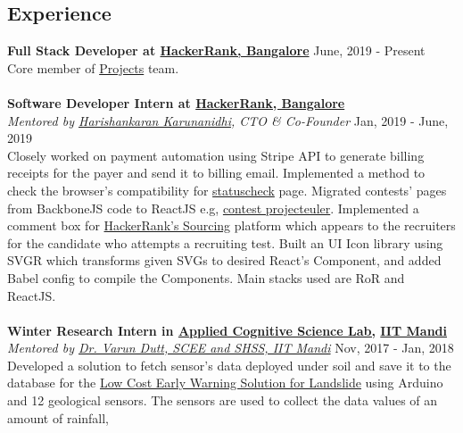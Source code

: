 \documentclass[margin, centered]{res}
\begin{document}
\begin{resume}
        \section{Experience}
            \textbf{Full Stack Developer at \href{https://www.hackerrank.com}{HackerRank, Bangalore}} \hfill June, 2019 - Present \\
            Core member of \href{https://www.hackerrank.com/products/projects}{Projects} team. \\
            \\
            \textbf{Software Developer Intern at \href{https://www.hackerrank.com}{HackerRank, Bangalore}} \\
            \emph{Mentored by \href{https://www.hackerrank.com/about-us/our-team/}{Harishankaran
            Karunanidhi}\footnotesize{, CTO \& Co-Founder}} \hfill Jan, 2019 - June, 2019 \\
            Closely worked on payment automation using Stripe API to generate billing receipts for
            the payer and send it to billing email. Implemented a method to check the browser's compatibility
            for \href{https://www.hackerrank.com/statuscheck}{statuscheck} page. Migrated contests' pages from
            BackboneJS code to ReactJS e.g, \href{https://www.hackerrank.com/projecteuler/}{contest projecteuler}.
            Implemented a comment box for \href{https://www.hackerrank.com/work}{HackerRank's Sourcing} platform
            which appears to the recruiters for the candidate who attempts a recruiting test. Built an UI Icon library
            using SVGR which transforms given SVGs to desired React's Component, and added Babel config to compile
            the Components. Main stacks used are RoR and ReactJS. \\
            \\
            \textbf{Winter Research Intern in \href{http://acslab.org}{Applied Cognitive Science Lab,} \href{https://iitmandi.ac.in/}{IIT Mandi}} \\
            \emph{Mentored by \href{https://faculty.iitmandi.ac.in/~varun/}{Dr. Varun Dutt, SCEE and SHSS, IIT Mandi}} \hfill Nov, 2017 - Jan, 2018 \\
            Developed a solution to fetch sensor’s data deployed under soil and save it to the database for the
            \href{http://landslidemonitoring.esy.es/}{Low Cost Early Warning Solution for Landslide} using Arduino
            and 12 geological sensors. The sensors are used to collect the data values of an amount of rainfall,

\end{resume}
\end{document}
